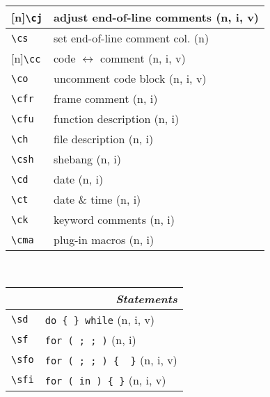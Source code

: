 \documentclass[oneside,10pt,landscape,DIV16]{scrartcl}
\newcommand{\Rep}{{\scriptsize{[n]}}}
\begin{document}
\begin{multicols}{3}
\begin{center}
\begin{tabular}[]{|p{11mm}|p{60mm}|}
\hline \Rep\verb'\cj'   & adjust end-of-line comments       \hfill (n, i, v)\\
\hline     \verb'\cs'   & set end-of-line comment col.      \hfill (n)      \\
%
\hline \Rep\verb'\cc'   & code $\leftrightarrow$ comment    \hfill (n, i, v)\\
\hline     \verb'\co'   & uncomment code block              \hfill (n, i, v)\\
%
\hline     \verb'\cfr'  & frame comment                     \hfill (n, i)   \\
\hline     \verb'\cfu'  & function description              \hfill (n, i)   \\
\hline     \verb'\ch'   & file description                  \hfill (n, i)   \\
\hline     \verb'\csh'  & shebang                           \hfill (n, i)   \\
\hline     \verb'\cd'   & date                              \hfill (n, i)   \\
\hline     \verb'\ct'   & date \& time                      \hfill (n, i)   \\
\hline     \verb'\ck'   & keyword comments                  \hfill (n, i)   \\
\hline     \verb'\cma'  & plug-in macros                    \hfill (n, i)   \\
\hline
\end{tabular}\\
%
%
\begin{tabular}[]{|p{11mm}|p{60mm}|}
\hline
\multicolumn{2}{|r|}{\textsl{\textbf{S}tatements}}                    \\[1.0ex]
\hline \verb'\sd'      & \verb'do { } while'          \hfill (n, i, v)\\
\hline \verb'\sf'      & \verb'for ( ; ; )'           \hfill (n, i)\\
\hline \verb'\sfo'     & \verb'for ( ; ; ) {  }'      \hfill (n, i, v)\\
\hline \verb'\sfi'     & \verb'for ( in ) { }'        \hfill (n, i, v)\\

\end{tabular}
\end{center}
\end{multicols}
\end{document}
